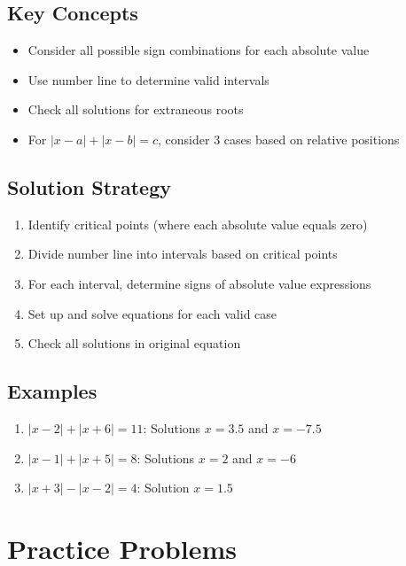 \documentclass[12pt]{article}
\begin{document}
\subsection*{Key Concepts}
\begin{tcolorbox}[colback=lightgray,colframe=primary,title=Multiple Absolute Values]
    \begin{itemize}
        \item Consider all possible sign combinations for each absolute value
        \item Use number line to determine valid intervals
        \item Check all solutions for extraneous roots
        \item For $|x-a| + |x-b| = c$, consider 3 cases based on relative positions
    \end{itemize}
\end{tcolorbox}

\subsection*{Solution Strategy}
\begin{enumerate}
    \item Identify critical points (where each absolute value equals zero)
    \item Divide number line into intervals based on critical points
    \item For each interval, determine signs of absolute value expressions
    \item Set up and solve equations for each valid case
    \item Check all solutions in original equation
\end{enumerate}

\subsection*{Examples}
\begin{enumerate}
    \item $|x-2| + |x+6| = 11$: Solutions $x = 3.5$ and $x = -7.5$
    \item $|x-1| + |x+5| = 8$: Solutions $x = 2$ and $x = -6$
    \item $|x+3| - |x-2| = 4$: Solution $x = 1.5$
\end{enumerate}

\section*{Practice Problems}
\end{document}
